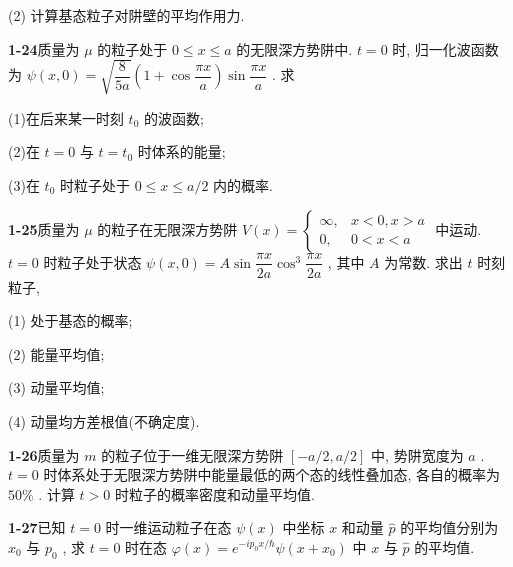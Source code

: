 (2) 计算基态粒子对阱壁的平均作用力.

\vfill

\newpage

\textbf{1-24}\quad 质量为 $\displaystyle \mu$ 的粒子处于 $\displaystyle 0 \leqslant x \leqslant a$ 的无限深方势阱中. $\displaystyle t = 0$ 时, 归一化波函数为 $\displaystyle \psi(x,0) = \sqrt{\dfrac{8}{5a}}\left(1 + \cos \dfrac{\pi x}{a}\right)\sin \dfrac{\pi x}{a}$ . 求

(1)在后来某一时刻 $\displaystyle t_0$ 的波函数;

(2)在 $\displaystyle t = 0$ 与 $\displaystyle t = t_0$ 时体系的能量;

(3)在 $\displaystyle t_0$ 时粒子处于 $\displaystyle 0 \leqslant x \leqslant a / 2$ 内的概率.

\vfill

\newpage

\textbf{1-25}\quad 质量为 $\displaystyle \mu$ 的粒子在无限深方势阱 $\displaystyle V(x) = \begin{cases} \infty, & x < 0, x > a \\ 0, & 0 < x < a \end{cases}$ 中运动. $\displaystyle t = 0$ 时粒子处于状态 $\displaystyle \psi(x,0) = A\sin \dfrac{\pi x}{2a}\cos^3\dfrac{\pi x}{2a}$ , 其中 $\displaystyle A$ 为常数. 求出 $\displaystyle t$ 时刻粒子,

(1) 处于基态的概率;

(2) 能量平均值;

(3) 动量平均值;

(4) 动量均方差根值(不确定度).

\vfill

\newpage

\textbf{1-26}\quad 质量为 $\displaystyle m$ 的粒子位于一维无限深方势阱 $\displaystyle [-a / 2, a / 2]$ 中, 势阱宽度为 $\displaystyle a$ . $\displaystyle t = 0$ 时体系处于无限深方势阱中能量最低的两个态的线性叠加态, 各自的概率为 $\displaystyle 50\%$ . 计算 $\displaystyle t > 0$ 时粒子的概率密度和动量平均值.

\vfill

\newpage

\textbf{1-27}\quad 已知 $\displaystyle t = 0$ 时一维运动粒子在态 $\displaystyle \psi(x)$ 中坐标 $\displaystyle x$ 和动量 $\displaystyle \hat{p}$ 的平均值分别为 $\displaystyle x_0$ 与 $\displaystyle p_0$ , 求 $\displaystyle t = 0$ 时在态 $\displaystyle \varphi(x) = e^{-ip_0x / \hbar} \psi(x + x_0)$ 中 $\displaystyle x$ 与 $\displaystyle \hat{p}$ 的平均值.

